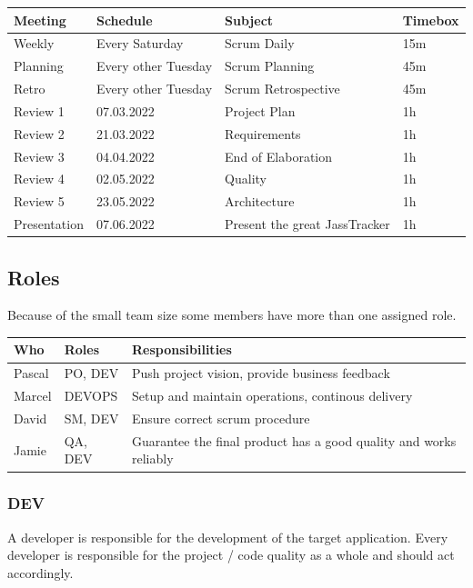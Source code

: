 \begin{table}[H]
    \begin{tabular}{l|l|l|l}
    \textbf{Meeting} & \textbf{Schedule} & \textbf{Subject} & \textbf{Timebox} \\
    \hline
    Weekly & Every Saturday & Scrum Daily & 15m \\
    Planning & Every other Tuesday & Scrum Planning & 45m \\
    Retro & Every other Tuesday & Scrum Retrospective & 45m \\
    Review 1 & 07.03.2022 & Project Plan & 1h \\
    Review 2 & 21.03.2022 & Requirements & 1h \\
    Review 3 & 04.04.2022 & End of Elaboration & 1h \\
    Review 4 & 02.05.2022 & Quality & 1h \\
    Review 5 & 23.05.2022 & Architecture & 1h \\
    Presentation & 07.06.2022 & Present the great JassTracker & 1h
    \end{tabular}
\end{table}

\subsection*{Roles}

Because of the small team size some members have more than one assigned role.

\begin{table}[H]
    \begin{tabular}{l|l|l}
    \textbf{Who} & \textbf{Roles} & \textbf{Responsibilities} \\
    \hline
    Pascal & PO, DEV & Push project vision, provide business feedback \\
    Marcel & DEVOPS & Setup and maintain operations, continous delivery \\
    David  & SM, DEV & Ensure correct scrum procedure \\
    Jamie  & QA, DEV & Guarantee the final product has a good quality and works reliably
    \end{tabular}
\end{table}

\subsubsection*{DEV}
A developer is responsible for the development of the target application.
Every developer is responsible for the project / code quality as a whole and should act accordingly.

